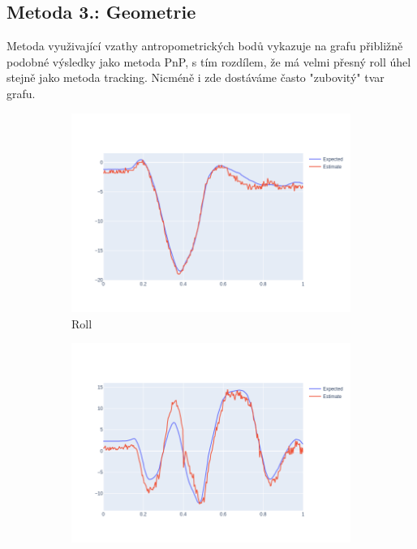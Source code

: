 \documentclass[12pt,a4paper,titlepage,final]{report}
\begin{document}
\subsection{Metoda 3.: Geometrie}
Metoda využivající vzathy antropometrických bodů vykazuje na grafu přibližně podobné výsledky jako metoda PnP, s tím rozdílem, že má velmi přesný roll úhel stejně jako metoda tracking. Nicméně i zde dostáváme často "zubovitý" tvar grafu.
\begin{figure}[!h]
  \centering
  \captionsetup{justification=centering}
  \begin{subfigure}[b]{0.32\textwidth}
    \includegraphics[width=\textwidth]{images/evaluation/geometry_roll_user_01_video_07.png}
   \caption{Roll}
    \label{fig:geo_roll}
  \end{subfigure}
  \begin{subfigure}[b]{0.32\textwidth}
    \includegraphics[width=\textwidth]{images/evaluation/geometry_yaw_user_01_video_07.png}

\end{subfigure}
\end{figure}
\end{document}
